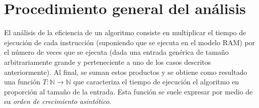 \section{Procedimiento general del análisis}

El análisis de la eficiencia de un algoritmo consiste en multiplicar
el tiempo de ejecución de cada instrucción (suponiendo que se ejecuta
en el modelo RAM) por el número de veces que se ejecuta (dada una
entrada genérica de tamaño arbitrariamente grande y perteneciente a uno de los casos descritos anteriormente). 
Al final, se suman estos productos y se obtiene como resultado una función \(T:\mathbb{N}\to\mathbb{N}\) que caracteriza el tiempo de ejecución el algoritmo en proporción al tamaño de la entrada. 
Esta función se suele expresar por medio de su \emph{orden de crecimiento asintótico}.

